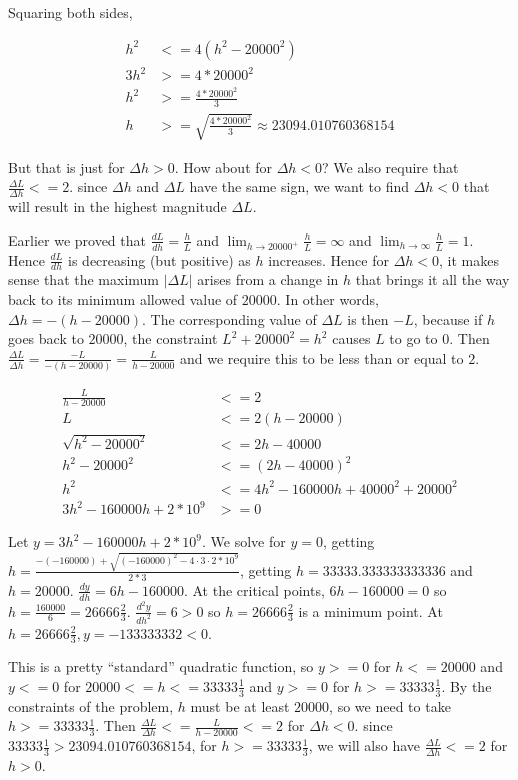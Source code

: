 \documentclass[9pt]{article}
\begin{document}
Squaring both sides,

\begin{align*}
  h^2 &<= 4(h^2 - 20000^2) \\
  3h^2 &>= 4 * 20000^2 \\
  h^2 &>= \frac{4 * 20000^2}{3} \\
  h &>= \sqrt{\frac{4 * 20000^2}{3}} \approx 23094.010760368154
\end{align*}

But that is just for $\Delta h > 0$. How about for $\Delta h < 0$? We also require that $\frac{\Delta L}{\Delta h} <= 2$. since $\Delta h$ and $\Delta L$ have the same sign, we want to find $\Delta h < 0$ that will result in the highest magnitude $\Delta L$.

Earlier we proved that $\frac{dL}{dh} = \frac{h}{L}$ and $\lim_{h \rightarrow 20000^+} \frac{h}{L} = \infty$ and $\lim_{h \rightarrow \infty} \frac{h}{L} = 1$. Hence $\frac{dL}{dh}$ is decreasing (but positive) as $h$ increases. Hence for $\Delta h < 0$, it makes sense that the maximum $|\Delta L|$ arises from a change in $h$ that brings it all the way back to its minimum allowed value of $20000$. In other words, $\Delta h = -(h - 20000)$. The corresponding value of $\Delta L$ is then $-L$, because if $h$ goes back to $20000$, the constraint $L^2 + 20000^2 = h^2$ causes $L$ to go to $0$. Then $\frac{\Delta L}{\Delta h} = \frac{-L}{-(h - 20000)} = \frac{L}{h - 20000}$ and we require this to be less than or equal to $2$.

\begin{align*}
  \frac{L}{h - 20000} &<= 2 \\
  L &<= 2(h - 20000) \\
  \sqrt{h^2 - 20000^2} &<= 2h - 40000 \\
  h^2 - 20000^2 &<= (2h - 40000)^2 \\
  h^2 &<= 4h^2 - 160000h + 40000^2 + 20000^2 \\
  3h^2 - 160000h + 2*10^9 &>= 0
\end{align*}

Let $y = 3h^2 - 160000h + 2*10^9$. We solve for $y = 0$, getting $h = \frac{-(-160000) + \sqrt{(-160000)^2 - 4 \cdot 3 \cdot 2 * 10^9}}{2 * 3}$, getting $h = 33333.333333333336$ and $h = 20000$. $\frac{dy}{dh} = 6h - 160000$. At the critical points, $6h - 160000 = 0$ so $h = \frac{160000}{6} = 26666 \frac{2}{3}$. $\frac{d^2 y}{dh^2} = 6 > 0$ so $h = 26666 \frac{2}{3}$ is a minimum point. At $h = 26666 \frac{2}{3}, y = -133333332 < 0$.

This is a pretty ``standard'' quadratic function, so $y >= 0$ for $h <= 20000$ and $y <= 0$ for $20000 <= h <= 33333 \frac{1}{3}$ and $y >= 0$ for $h >= 33333 \frac{1}{3}$. By the constraints of the problem, $h$ must be at least $20000$, so we need to take $h >= 33333 \frac{1}{3}$. Then $\frac{\Delta L}{\Delta h} <= \frac{L}{h - 20000} <= 2$ for $\Delta h < 0$. since $33333 \frac{1}{3} > 23094.010760368154$, for $h >= 33333 \frac{1}{3}$, we will also have $\frac{\Delta L}{\Delta h} <= 2$ for $h > 0$.
\end{document}
